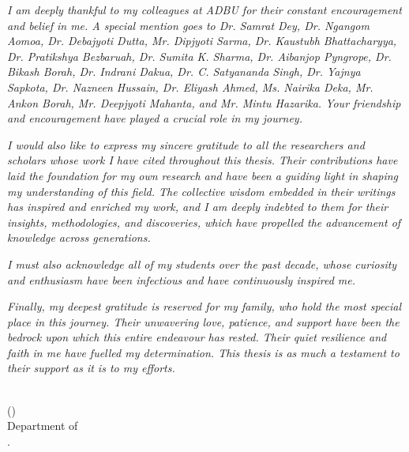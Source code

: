     \newpage
    \par\textsl{I am deeply thankful to my colleagues at ADBU for their constant encouragement and belief in me. A special mention goes to Dr. Samrat Dey, Dr. Ngangom Aomoa, Dr. Debajyoti Dutta, Mr. Dipjyoti Sarma, Dr. Kaustubh Bhattacharyya, Dr. Pratikshya Bezbaruah, Dr. Sumita K. Sharma, Dr. Aibanjop Pyngrope, Dr. Bikash Borah, Dr. Indrani Dakua, Dr. C. Satyananda Singh, Dr. Yajnya Sapkota, Dr. Nazneen Hussain, Dr. Eliyash Ahmed, Ms. Nairika Deka, Mr. Ankon Borah, Mr. Deepjyoti Mahanta, and Mr. Mintu Hazarika. Your friendship and encouragement have played a crucial role in my journey.}
    
    \par\textsl{I would also like to express my sincere gratitude to all the researchers and scholars whose work I have cited throughout this thesis. Their contributions have laid the foundation for my own research and have been a guiding light in shaping my understanding of this field. The collective wisdom embedded in their writings has inspired and enriched my work, and I am deeply indebted to them for their insights, methodologies, and discoveries, which have propelled the advancement of knowledge across generations.}
    
    \par\textsl{I must also acknowledge all of my students over the past decade, whose curiosity and enthusiasm have been infectious and have continuously inspired me.}
    
    \par\textsl{Finally, my deepest gratitude is reserved for my family, who hold the most special place in this journey. Their unwavering love, patience, and support have been the bedrock upon which this entire endeavour has rested. Their quiet resilience and faith in me have fuelled my determination. This thesis is as much a testament to their support as it is to my efforts.}
    
    \bigskip\medskip
    \bigskip\medskip
    \bigskip\medskip\bigskip\medskip
    \noindent\\
    \hfill (\authorname)
    \noindent\\
    \hfill Department of \department\\
    \hfill \university.